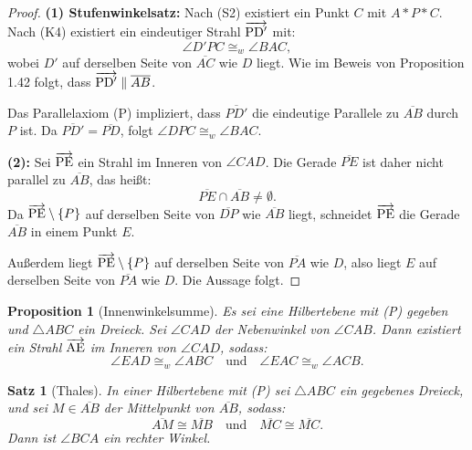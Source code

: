 \documentclass[a4paper,12pt]{article}
\theoremstyle{break}
\newtheorem{theorem}[definition]{Satz}
\newtheorem{proposition}[definition]{Proposition}
\begin{document}
\begin{proof}
\textbf{(1) Stufenwinkelsatz:}  
Nach (S2) existiert ein Punkt \(C\) mit \(A * P * C\). Nach (K4) existiert ein eindeutiger Strahl \(\overrightarrow{\rm PD'}\) mit:
\[
\angle D'PC \cong_w \angle BAC,
\]
wobei \(D'\) auf derselben Seite von \(\overline{AC}\) wie \(D\) liegt. Wie im Beweis von Proposition 1.42 folgt, dass \(\overrightarrow{\rm PD'} \parallel \overline{AB}\).  

Das Parallelaxiom (P) impliziert, dass \(\overline{PD'}\) die eindeutige Parallele zu \(\overline{AB}\) durch \(P\) ist. Da \(\overline{PD'} = \overline{PD}\), folgt \(\angle DPC \cong_w \angle BAC\).  

\textbf{(2):}  
Sei \(\overrightarrow{\rm PE}\) ein Strahl im Inneren von \(\angle CAD\). Die Gerade \(\overline{PE}\) ist daher nicht parallel zu \(\overline{AB}\), das heißt:
\[
\overline{PE} \cap \overline{AB} \neq \emptyset.
\]
Da \(\overrightarrow{\rm PE} \setminus \{P\}\) auf derselben Seite von \(\overline{DP}\) wie \(\overline{AB}\) liegt, schneidet \(\overrightarrow{\rm PE}\) die Gerade \(\overline{AB}\) in einem Punkt \(E\).  

Außerdem liegt \(\overrightarrow{\rm PE} \setminus \{P\}\) auf derselben Seite von \(\overline{PA}\) wie \(D\), also liegt \(E\) auf derselben Seite von \(\overline{PA}\) wie \(D\). Die Aussage folgt.
\end{proof}

\begin{proposition}[Innenwinkelsumme]\label{prop:innenwinkelsumme}
Es sei eine Hilbertebene mit (P) gegeben und \(\triangle ABC\) ein Dreieck. Sei \(\angle CAD\) der Nebenwinkel von \(\angle CAB\). Dann existiert ein Strahl \(\overrightarrow{\rm AE}\) im Inneren von \(\angle CAD\), sodass:
\[
\angle EAD \cong_w \angle ABC \quad \text{und} \quad \angle EAC \cong_w \angle ACB.
\]
\end{proposition}

\begin{theorem}[Thales]
In einer Hilbertebene mit (P) sei \(\triangle ABC\) ein gegebenes Dreieck, und sei \(M \in \overline{AB}\) der Mittelpunkt von \(\overline{AB}\), sodass:
\[
\overline{AM} \cong \overline{MB} \quad \text{und} \quad \overline{MC} \cong \overline{MC}.
\]
Dann ist \(\angle BCA\) ein rechter Winkel.
\end{theorem}
\end{document}
